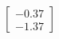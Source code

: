 \documentclass[preview]{standalone}
\begin{document}
\begin{align*}
\begin{bmatrix} -0.37 \\ -1.37 \end{bmatrix}
\end{align*}
\end{document}

